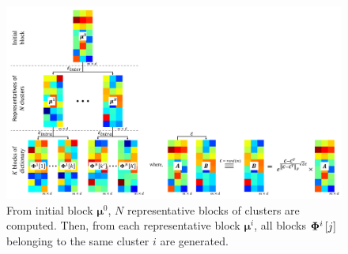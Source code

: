 \begin{figure}[!b]
\centering
\includegraphics[width=1\textwidth,keepaspectratio]{images/Dictionary_generating.png} %
\centering
\caption{From initial block $\boldsymbol{\mu}^0$, $N$ representative blocks of clusters are computed. Then, from each representative block $\boldsymbol{\mu}^i$, all blocks $\boldsymbol{\Phi}^i\left[ j \right]$ belonging to the same cluster $i$ are generated.}
\label{fig:Dictionary_generating}
\end{figure}